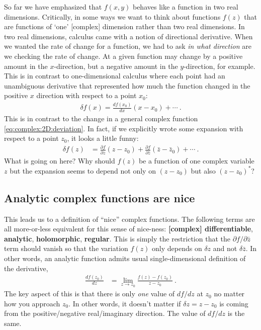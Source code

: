So far we have emphasized that $f(x,y)$ behaves like a function in two real dimensions. Critically, in some ways we want to think about functions $f(z)$ that are functions of `one' [complex] dimension rather than two real dimensions. In two real dimensions, calculus came with a notion of directional derivative. When we wanted the rate of change for a function, we had to ask \emph{in what direction} are we checking the rate of change. At a given function may change by a positive amount in the $x$-direction, but a negative amount in the $y$-direction, for example. This is in contrast to one-dimensional calculus where each point had an unambiguous derivative that represented how much the function changed in the positive $x$ direction with respect to a point $x_0$:
\begin{align}
	\delta f(x) = \frac{d f(x_0)}{d x} (x-x_0) + \cdots \ .
\end{align}
This is in contrast to the change in a general complex function \eqref{eq:complex:2D:deviation}. In fact, if we explicitly wrote some expansion with respect to a point $z_0$, it looks a little funny:
\begin{align}
	\delta f(z) &= 
	\frac{\partial f}{\partial z}(z-z_0) +
	\frac{\partial f}{\partial \bar z}(\bar z-\bar z_0) + \cdots \ .
\end{align}
What is going on here? Why should $f(z)$ be a function of one complex variable $z$ but the expansion seems to depend not only on $(z-z_0)$ but also $(z-z_0)^*$?

\subsection{Analytic complex functions are nice}

This leads us to a definition of ``nice'' complex functions. The following terms are all more-or-less equivalent for this sense of nice-ness: \textbf{[complex] differentiable}, \textbf{analytic}, \textbf{holomorphic}, \textbf{regular}. This is simply the restriction that the $\partial f/\partial \bar z$ term should vanish so that the variation $f(z)$ only depends on $\delta z$ and not $\delta\bar z$. In other words, an analytic function admits usual single-dimensional definition of the derivative,
\begin{align}
	\frac{df(z_0)}{dz} &= \lim_{z\to z_0} \frac{f(z)-f(z_0)}{z-z_0} \ .
	\label{eq:df:dz:analytic:def}
\end{align}
The key aspect of this is that there is only \emph{one} value of $df/dz$ at $z_0$ no matter how you approach $z_0$. In other words, it doesn't matter if $\delta z = z-z_0$ is coming from the positive/negative real/imaginary direction. The value of $df/dz$ is the same. 

